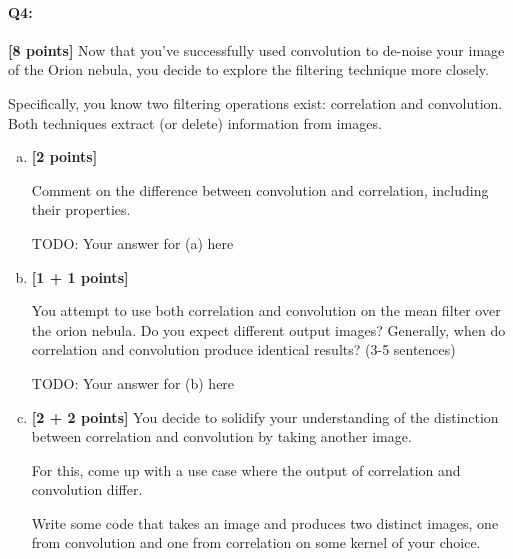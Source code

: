 
\pagebreak
\paragraph{Q4:} \textbf{[8 points]} Now that you've successfully used convolution to de-noise your image of the Orion nebula, you decide to explore the filtering technique more closely. 

Specifically, you know two filtering operations exist: correlation and convolution. Both techniques extract (or delete) information from images.

\begin{enumerate}[(a)]
    \item \textbf{[2 points]} 
    \begin{tcolorbox}[colback=orange!5!white,colframe=orange!75!black]
    Comment on the difference between convolution and correlation, including their properties. 
    \end{tcolorbox}
    
    \begin{mdframed}
        TODO: Your answer for (a) here
    \end{mdframed}
    

    \item \textbf{[1 + 1 points]} 
    \begin{tcolorbox}[colback=orange!5!white,colframe=orange!75!black]
    You attempt to use both correlation and convolution on the mean filter over the orion nebula. Do you expect different output images? Generally, when do correlation and convolution produce identical results? (3-5 sentences)
    \end{tcolorbox}
    
    \begin{mdframed}
        TODO: Your answer for (b) here
    \end{mdframed}

    \item \textbf{[2 + 2 points]}
    You decide to solidify your understanding of the distinction between correlation and convolution by taking another image.
    
    \begin{tcolorbox}[colback=orange!5!white,colframe=orange!75!black]
    For this, come up with a use case where the output of correlation and convolution differ.
    
    Write some code that takes an image and produces two distinct images, one from convolution and one from correlation on some kernel of your choice. 
    

\end{tcolorbox}
\end{enumerate}
